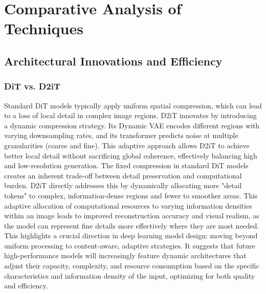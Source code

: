 \documentclass[a4paper]{article}
\begin{document}
\section{Comparative Analysis of Techniques}
\subsection{Architectural Innovations and Efficiency}
\subsubsection*{DiT vs. D2iT}
Standard DiT models typically apply uniform spatial compression, which can lead to a loss of local detail in complex image regions. D2iT \cite{Jia2025D2iT} innovates by introducing a dynamic compression strategy. Its Dynamic VAE encodes different regions with varying downsampling rates, and its transformer predicts noise at multiple granularities (coarse and fine). This adaptive approach allows D2iT to achieve better local detail without sacrificing global coherence, effectively balancing high and low-resolution generation. The fixed compression in standard DiT models creates an inherent trade-off between detail preservation and computational burden. D2iT directly addresses this by dynamically allocating more "detail tokens" to complex, information-dense regions and fewer to smoother areas. This adaptive allocation of computational resources to varying information densities within an image leads to improved reconstruction accuracy and visual realism, as the model can represent fine details more effectively where they are most needed. This highlights a crucial direction in deep learning model design: moving beyond uniform processing to content-aware, adaptive strategies. It suggests that future high-performance models will increasingly feature dynamic architectures that adjust their capacity, complexity, and resource consumption based on the specific characteristics and information density of the input, optimizing for both quality and efficiency.
\end{document}
